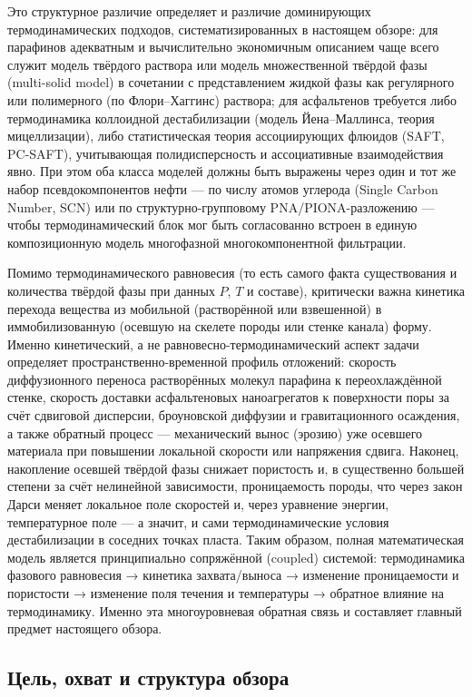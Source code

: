\documentclass[11pt]{extarticle}
\begin{document}
Это структурное различие определяет и различие доминирующих термодинамических подходов, систематизированных в настоящем обзоре: для парафинов адекватным и вычислительно экономичным описанием чаще всего служит модель твёрдого раствора или модель множественной твёрдой фазы (multi-solid model) в сочетании с представлением жидкой фазы как регулярного или полимерного (по Флори--Хаггинс) раствора; для асфальтенов требуется либо термодинамика коллоидной дестабилизации (модель Йена--Маллинса, теория мицеллизации), либо статистическая теория ассоциирующих флюидов (SAFT, PC-SAFT), учитывающая полидисперсность и ассоциативные взаимодействия явно. При этом оба класса моделей должны быть выражены через один и тот же набор псевдокомпонентов нефти --- по числу атомов углерода (Single Carbon Number, SCN) или по структурно-групповому PNA/PIONA-разложению --- чтобы термодинамический блок мог быть согласованно встроен в единую композиционную модель многофазной многокомпонентной фильтрации.

Помимо термодинамического равновесия (то есть самого факта существования и количества твёрдой фазы при данных \(P\), \(T\) и составе), критически важна кинетика перехода вещества из мобильной (растворённой или взвешенной) в иммобилизованную (осевшую на скелете породы или стенке канала) форму. Именно кинетический, а не равновесно-термодинамический аспект задачи определяет пространственно-временной профиль отложений: скорость диффузионного переноса растворённых молекул парафина к переохлаждённой стенке, скорость доставки асфальтеновых наноагрегатов к поверхности поры за счёт сдвиговой дисперсии, броуновской диффузии и гравитационного осаждения, а также обратный процесс --- механический вынос (эрозию) уже осевшего материала при повышении локальной скорости или напряжения сдвига. Наконец, накопление осевшей твёрдой фазы снижает пористость и, в существенно большей степени за счёт нелинейной зависимости, проницаемость породы, что через закон Дарси меняет локальное поле скоростей и, через уравнение энергии, температурное поле --- а значит, и сами термодинамические условия дестабилизации в соседних точках пласта. Таким образом, полная математическая модель является принципиально сопряжённой (coupled) системой: термодинамика фазового равновесия → кинетика захвата/выноса → изменение проницаемости и пористости → изменение поля течения и температуры → обратное влияние на термодинамику. Именно эта многоуровневая обратная связь и составляет главный предмет настоящего обзора.

\subsection{Цель, охват и структура обзора}\label{ux446ux435ux43bux44c-ux43eux445ux432ux430ux442-ux438-ux441ux442ux440ux443ux43aux442ux443ux440ux430-ux43eux431ux437ux43eux440ux430}
\end{document}
